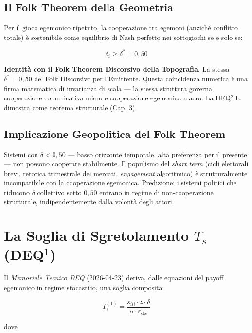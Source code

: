 \subsection{Il Folk Theorem della
Geometria}\label{il-folk-theorem-della-geometria}

\Proved{} Per il gioco egemonico ripetuto, la cooperazione tra egemoni
(anziché conflitto totale) è sostenibile come equilibrio di Nash
perfetto nei sottogiochi se e solo se:

\[
\delta_i \geq \delta^* = 0{,}50
\]

\Hypoth{} \textbf{Identità con il Folk Theorem Discorsivo della
Topografia.} La stessa \(\delta^* = 0{,}50\) del Folk Discorsivo per
l'Emittente. Questa coincidenza numerica è una firma matematica di
invarianza di scala --- la stessa struttura governa cooperazione
comunicativa micro e cooperazione egemonica macro. La DEQ$^2$ la dimostra
come teorema strutturale (Cap. 3).

\subsection{Implicazione Geopolitica del Folk
Theorem}\label{implicazione-geopolitica-del-folk-theorem}

\Hypoth{} Sistemi con \(\delta < 0{,}50\) --- basso orizzonte temporale,
alta preferenza per il presente --- non possono cooperare stabilmente.
Il populismo del \emph{short term} (cicli elettorali brevi, retorica
trimestrale dei mercati, \emph{engagement} algoritmico) è
strutturalmente incompatibile con la cooperazione egemonica. Predizione:
i sistemi politici che riducono \(\delta\) collettivo sotto \(0{,}50\)
entrano in regime di non-cooperazione strutturale, indipendentemente
dalla volontà degli attori.



\section{\texorpdfstring{La Soglia di Sgretolamento \(T_s\)
(DEQ$^1$)}{La Soglia di Sgretolamento T\_s (DEQ$^1$)}}\label{la-soglia-di-sgretolamento-t_s-dequxb9}

Il \emph{Memoriale Tecnico DEQ} (2026-04-23) deriva, dalle equazioni del
payoff egemonico in regime stocastico, una soglia composita:

\[
T_s^{(1)} = \frac{s_{iii} \cdot z \cdot \delta}{\sigma \cdot \varepsilon_{\text{dis}}}
\]

dove:


